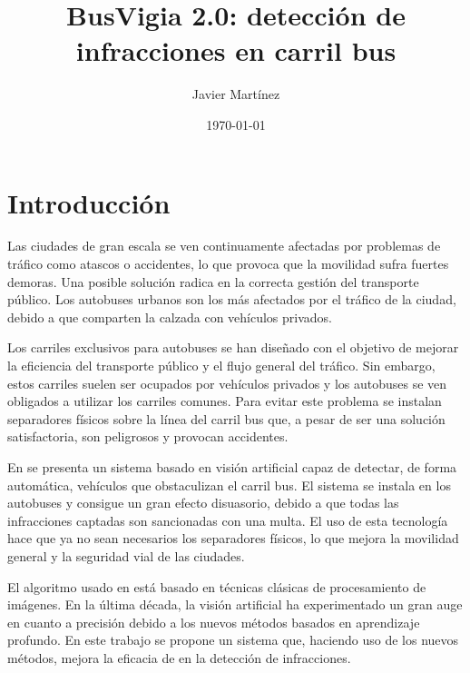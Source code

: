 \documentclass[a4paper, oneside, onecolumn, 11pt]{article}
\begin{document}
\title{\huge{BusVigia 2.0: detección de infracciones en carril bus}}

\author[1,*]{Javier Martínez}
\date{\today}

\maketitle

\singlespace

\section{Introducción}
\label{sec:intro}

Las ciudades de gran escala se ven continuamente afectadas por problemas de tráfico como atascos o accidentes, lo que provoca que la movilidad sufra fuertes demoras. Una posible solución radica en la correcta gestión del transporte público. Los autobuses urbanos son los más afectados por el tráfico de la ciudad, debido a que comparten la calzada con vehículos privados.

Los carriles exclusivos para autobuses se han diseñado con el objetivo de mejorar la eficiencia del transporte público y el flujo general del tráfico. Sin embargo, estos carriles suelen ser ocupados por vehículos privados y los autobuses se ven obligados a utilizar los carriles comunes. Para evitar este problema se instalan separadores físicos sobre la línea del carril bus que, a pesar de ser una solución satisfactoria, son peligrosos y provocan accidentes.

En \cite{FernandezLopez2013} se presenta un sistema basado en visión artificial capaz de detectar, de forma automática, vehículos que obstaculizan el carril bus. El sistema se instala en los autobuses y consigue un gran efecto disuasorio, debido a que todas las infracciones captadas son sancionadas con una multa. El uso de esta tecnología hace que ya no sean necesarios los separadores físicos, lo que mejora la movilidad general y la seguridad vial de las ciudades.

El algoritmo usado en \cite{FernandezLopez2013} está basado en técnicas clásicas de procesamiento de imágenes. En la última década, la visión artificial ha experimentado un gran auge en cuanto a precisión debido a los nuevos métodos basados en aprendizaje profundo. En este trabajo se propone un sistema que, haciendo uso de los nuevos métodos, mejora la eficacia de \cite{FernandezLopez2013} en la detección de infracciones.
\end{document}
